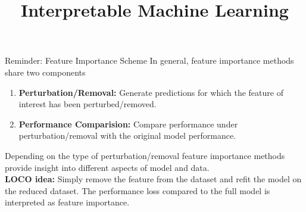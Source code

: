 \documentclass[11pt,compress,t,notes=noshow, aspectratio=169, xcolor=table]{beamer}
\title{Interpretable Machine Learning}
\date{}
\begin{document}
	\newcommand{\titlefigure}{figure_man/feature-importance.png}
    \newcommand{\learninggoals}{
    	\item Definition of LOCO
    	\item Interpretation of LOCO}
	
	
	

	

\begin{vbframe}{Reminder: Feature Importance Scheme}
In general, feature importance methods share two components
\lz
\begin{enumerate}
  \item \textbf{Perturbation/Removal:} Generate predictions for which the feature of interest has been perturbed/removed.
  \item \textbf{Performance Comparision:} Compare performance under perturbation/removal with the original model performance.
\end{enumerate}
\lz
Depending on the type of perturbation/removal feature importance methods provide insight into different aspects of model and data.\\
\lz
\textbf{LOCO idea:} Simply remove the feature from the dataset and refit the model on the reduced dataset. The performance loss compared to the full model is interpreted as feature importance.\\

\end{vbframe}
\end{document}
